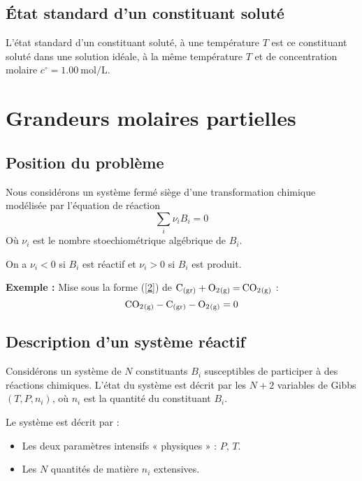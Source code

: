 \documentclass{article}
\let\oldref\ref
\renewcommand{\ref}[1]{(\oldref{#1})}
\begin{document}
\subsection{État standard d’un constituant soluté}
\begin{enonce}
    L’état standard d’un constituant soluté, à une température $T$ est ce constituant soluté dans une solution idéale, à la
même température $T$ et de concentration molaire $c^\circ = \SI{1,00}{\mol\per\liter}$.
\end{enonce}

\section{Grandeurs molaires partielles}
\subsection{Position du problème}
Nous considérons un système fermé siège d’une transformation chimique modélisée par l’équation de réaction \begin{equation}\label{2}
    \sum_i\nu_iB_i=0
\end{equation}
Où $\nu_i$ est le nombre stoechiométrique algébrique de $B_i$.
\begin{tableau}
    On a $\nu_i<0$ si $B_i$ est réactif et $\nu_i>0$ si $B_i$ est produit.
    
    \textbf{Exemple :} Mise sous la forme \ref{2} de $\ce{C_{(gr)} + O2_{(g)} = CO2_{(g)}}$ :
    $$\ce{CO2_{(g)} - C_{(gr)} - O2_{(g)}} = 0$$
\end{tableau}

\subsection{Description d’un système réactif}
Considérons un système de $N$ constituants $B_i$ susceptibles de participer à des réactions chimiques. L’état du système est décrit par les $N+2$ variables de Gibbs $(T,P,n_i)$, où $n_i$ est la quantité du constituant $B_i$.

\begin{tableau}
    Le système est décrit par :
    \begin{itemize}
        \item Les deux paramètres intensifs « physiques » : $P,\,T$.
        \item Les $N$ quantités de matière $n_i$ extensives.
    \end{itemize}
\end{tableau}
\end{document}
